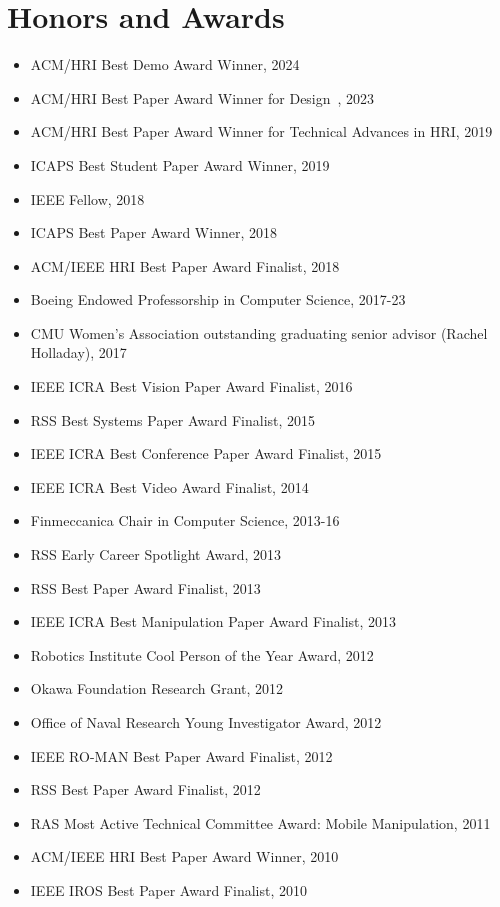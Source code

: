 \documentclass[10pt]{article}
\begin{document}
\section{Honors and Awards}
\begin{itemize}
\addtolength{\itemsep}{-0.5\baselineskip}
\item ACM/HRI Best Demo Award Winner, 2024
\item ACM/HRI Best Paper Award Winner for Design~, 2023
\item ACM/HRI Best Paper Award Winner for Technical Advances in HRI, 2019
\item ICAPS Best Student Paper Award Winner, 2019
\item IEEE Fellow, 2018
\item ICAPS Best Paper Award Winner, 2018
\item ACM/IEEE HRI Best Paper Award Finalist, 2018
\item Boeing Endowed Professorship in Computer Science, 2017-23
\item CMU Women’s Association outstanding graduating senior advisor (Rachel Holladay), 2017
\item IEEE ICRA Best Vision Paper Award Finalist, 2016
\item RSS Best Systems Paper Award Finalist, 2015
\item IEEE ICRA Best Conference Paper Award Finalist, 2015
\item IEEE ICRA Best Video Award Finalist, 2014
\item Finmeccanica Chair in Computer Science, 2013-16
\item RSS Early Career Spotlight Award, 2013
\item RSS Best Paper Award Finalist, 2013
\item IEEE ICRA Best Manipulation Paper Award Finalist, 2013
\item Robotics Institute Cool Person of the Year Award, 2012
\item Okawa Foundation Research Grant, 2012
\item Office of Naval Research Young Investigator Award, 2012
\item IEEE RO-MAN Best Paper Award Finalist, 2012
\item RSS Best Paper Award Finalist, 2012
\item RAS Most Active Technical Committee Award: Mobile Manipulation, 2011 
\item ACM/IEEE HRI Best Paper Award Winner, 2010
\item IEEE IROS Best Paper Award Finalist, 2010

\end{itemize}
\end{document}
